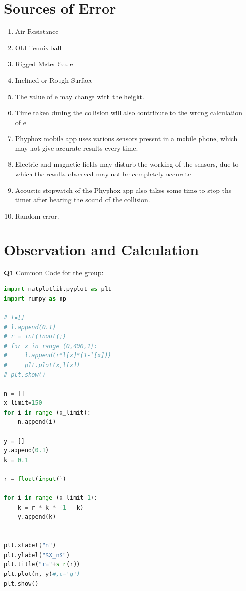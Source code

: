 \documentclass[11pt]{scrartcl} %
\begin{document}
\section{Sources of Error}
\begin{enumerate}
	\item Air Resistance
	\item Old Tennis ball
	\item Rigged Meter Scale
	\item Inclined or Rough Surface
	\item The value of e may change with the height.
	\item Time taken during the collision will also contribute to the wrong calculation of e
	\item Phyphox mobile app uses various sensors present in a mobile phone, which may not give accurate results every time.
	\item Electric and magnetic fields may disturb the working of the sensors, due to which the results observed may not be completely accurate.
	\item Acoustic stopwatch of the Phyphox app also takes some time to stop the timer after hearing the sound of the collision.
	\item Random error.
\end{enumerate}
\newpage

\section{Observation and Calculation}
\textbf{Q1} Common Code for the group:
\begin{lstlisting}[language=Python, caption= Code for plotting X_n vs n graph for a given r]
import matplotlib.pyplot as plt
import numpy as np

# l=[]
# l.append(0.1)
# r = int(input())
# for x in range (0,400,1): 
#     l.append(r*l[x]*(1-l[x]))
#     plt.plot(x,l[x])
# plt.show()

n = []
x_limit=150
for i in range (x_limit):
    n.append(i)

y = []
y.append(0.1)
k = 0.1

r = float(input())

for i in range (x_limit-1):
    k = r * k * (1 - k)
    y.append(k)


plt.xlabel("n")
plt.ylabel("$X_n$")
plt.title("r="+str(r))
plt.plot(n, y)#,c='g')
plt.show() 
\end{lstlisting}
\newpage
\end{document}

